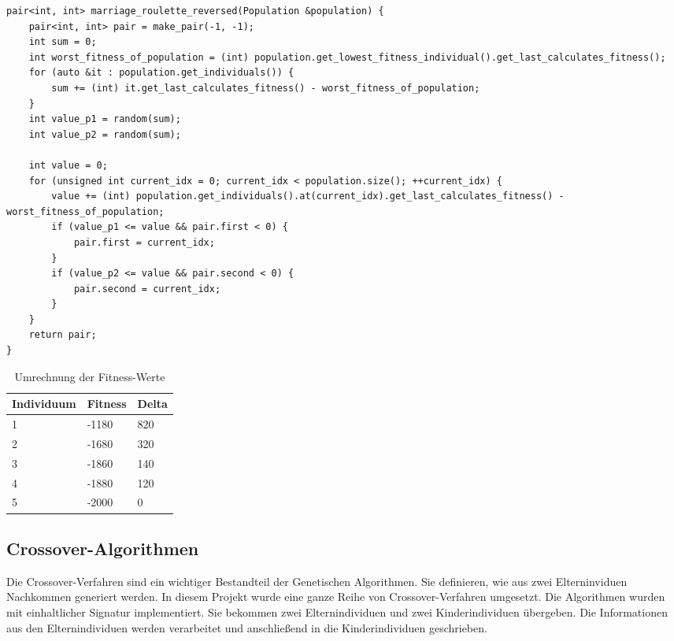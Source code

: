 \begin{minipage}{\linewidth}
\begin{lstlisting}[caption={Marriage-Roulette Algorithmus}, firstnumber=1, captionpos=b, label=lst:marriage]
pair<int, int> marriage_roulette_reversed(Population &population) {
	pair<int, int> pair = make_pair(-1, -1);
	int sum = 0;
	int worst_fitness_of_population = (int) population.get_lowest_fitness_individual().get_last_calculates_fitness();
	for (auto &it : population.get_individuals()) {
		sum += (int) it.get_last_calculates_fitness() - worst_fitness_of_population;
	}
	int value_p1 = random(sum);
	int value_p2 = random(sum);

	int value = 0;
	for (unsigned int current_idx = 0; current_idx < population.size(); ++current_idx) {
		value += (int) population.get_individuals().at(current_idx).get_last_calculates_fitness() - worst_fitness_of_population;
		if (value_p1 <= value && pair.first < 0) {
			pair.first = current_idx;
		}
		if (value_p2 <= value && pair.second < 0) {
			pair.second = current_idx;
		}
	}
	return pair;
}
\end{lstlisting}
\end{minipage}
\begin{table}[H]
\center
\caption{Umrechnung der Fitness-Werte}
\begin{tabular}{|l|l|l|}
 Individuum & Fitness & Delta \\ 
\hline
 1 & -1180 & 820 \\  
 2 & -1680 & 320 \\  
 3 & -1860 & 140 \\  
 4 & -1880 & 120 \\  
 5 & -2000 & 0 \\  
\end{tabular}
\label{tab:roulette}
\end{table}

\subsection{Crossover-Algorithmen}
Die Crossover-Verfahren sind ein wichtiger Bestandteil der Genetischen Algorithmen. Sie definieren, wie aus zwei Elterninviduen Nachkommen generiert werden.
In diesem Projekt wurde eine ganze Reihe von Crossover-Verfahren umgesetzt. Die Algorithmen wurden mit einhaltlicher Signatur implementiert. Sie bekommen zwei Elternindividuen und zwei Kinderindividuen übergeben.
Die Informationen aus den Elternindividuen werden verarbeitet und anschließend in die Kinderindividuen geschrieben.

